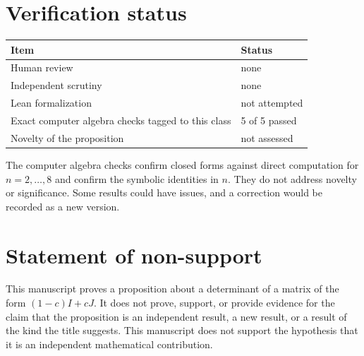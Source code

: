 \documentclass[11pt]{article}
\begin{document}
\section{Verification status}
\begin{center}
\small
\begin{tabular}{ll}
\toprule
Item & Status \\
\midrule
Human review & none \\
Independent scrutiny & none \\
Lean formalization & not attempted \\
Exact computer algebra checks tagged to this class & 5 of 5 passed \\
Novelty of the proposition & not assessed \\
\bottomrule
\end{tabular}
\end{center}
The computer algebra checks confirm closed forms against direct computation for $n=2,\dots,8$ and confirm the symbolic identities in $n$. They do not address novelty or significance. Some results could have issues, and a correction would be recorded as a new version.

\section{Statement of non-support}
This manuscript proves a proposition about a determinant of a matrix of the form $(1-c)I+cJ$. It does not prove, support, or provide evidence for the claim that the proposition is an independent result, a new result, or a result of the kind the title suggests. This manuscript does not support the hypothesis that it is an independent mathematical contribution.


\end{document}
